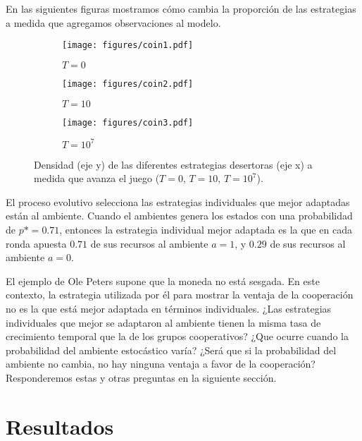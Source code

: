 \documentclass[a4paper,10pt]{article}
\begin{document}
En las siguientes figuras mostramos cómo cambia la proporción de las estrategias a medida que agregamos observaciones al modelo.
%
\begin{figure}[H]
    \centering
    \begin{subfigure}[b]{0.32\textwidth}
    \texttt{[image: figures/coin1.pdf]}
    \caption{$T = 0$}
    \end{subfigure}
    \begin{subfigure}[b]{0.32\textwidth}
    \texttt{[image: figures/coin2.pdf]}
    \caption{$T = 10$}
    \end{subfigure}
    \begin{subfigure}[b]{0.32\textwidth}
    \texttt{[image: figures/coin3.pdf]}
    \caption{$T = 10^7$}
    \end{subfigure}
    \caption{Densidad (eje y) de las diferentes estrategias desertoras (eje x) a medida que avanza el juego ($T=0, \, T=10, \, T=10^7$).}
    \label{fig:estrategias_individuales}
\end{figure}

El proceso evolutivo selecciona las estrategias individuales que mejor adaptadas están al ambiente.
Cuando el ambientes genera los estados con una probabilidad de $p*=0.71$, entonces la estrategia individual mejor adaptada es la que en cada ronda apuesta $0.71$ de sus recursos al ambiente $a=1$, y $0.29$ de sus recursos al ambiente $a=0$.


El ejemplo de Ole Peters supone que la moneda no está sesgada.
En este contexto, la estrategia utilizada por él para mostrar la ventaja de la cooperación no es la que está mejor adaptada en términos individuales.
¿Las estrategias individuales que mejor se adaptaron al ambiente tienen la misma tasa de crecimiento temporal que la de los grupos cooperativos?
¿Que ocurre cuando la probabilidad del ambiente estocástico varía? 
¿Será que si la probabilidad del ambiente no cambia, no hay ninguna ventaja a favor de la cooperación?
Responderemos estas y otras preguntas en la siguiente sección.

\section{Resultados}
\end{document}
